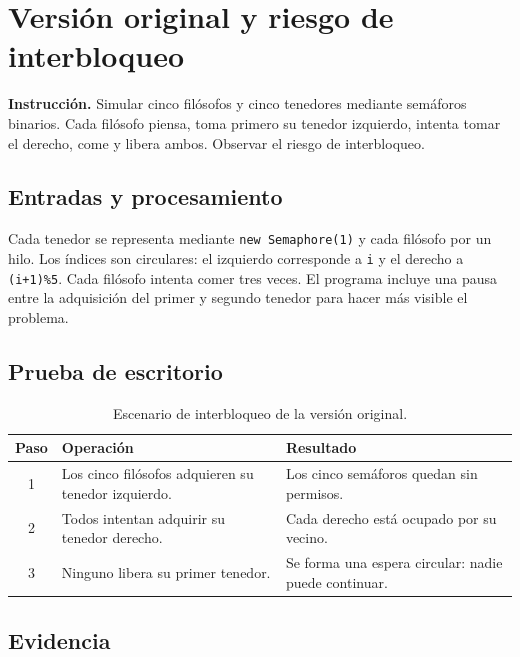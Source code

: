 \documentclass[12pt,oneside]{book}
\begin{document}
\frontmatter
\tableofcontents
\listoffigures
\listoftables
\mainmatter

\chapter{Versión original y riesgo de interbloqueo}
\textbf{Instrucción.} Simular cinco filósofos y cinco tenedores mediante semáforos binarios. Cada filósofo piensa, toma primero su tenedor izquierdo, intenta tomar el derecho, come y libera ambos. Observar el riesgo de interbloqueo.

\section{Entradas y procesamiento}
Cada tenedor se representa mediante \texttt{new Semaphore(1)} y cada filósofo por un hilo. Los índices son circulares: el izquierdo corresponde a \texttt{i} y el derecho a \texttt{(i+1)\%5}. Cada filósofo intenta comer tres veces. El programa incluye una pausa entre la adquisición del primer y segundo tenedor para hacer más visible el problema.

\section{Prueba de escritorio}
\begin{table}[H]\centering
\caption{Escenario de interbloqueo de la versión original.}
\begin{tabularx}{\textwidth}{c X X}\toprule
Paso & Operación & Resultado\\\midrule
1 & Los cinco filósofos adquieren su tenedor izquierdo. & Los cinco semáforos quedan sin permisos.\\
2 & Todos intentan adquirir su tenedor derecho. & Cada derecho está ocupado por su vecino.\\
3 & Ninguno libera su primer tenedor. & Se forma una espera circular: nadie puede continuar.\\\bottomrule
\end{tabularx}\end{table}

\section{Evidencia}
\end{document}
